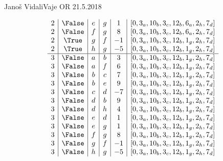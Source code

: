 \begin{naloga}{Janoš Vidali}{Vaje OR 21.5.2018}
\begin{odgovor}
\begin{tabela}
$$\begin{array}{c|c|c|c|c|c}
2 & \False & e & g &  1 & [0, 3_a, 10_b, 3_c, 12_b, 6_a, 2_h, 7_d] \\
2 & \False & f & g &  8 & [0, 3_a, 10_b, 3_c, 12_b, 6_a, 2_h, 7_d] \\
2 & \True  & g & f & -1 & [0, 3_a, 10_b, 3_c, 12_b, 1_g, 2_h, 7_d] \\
2 & \True  & h & g & -5 & [0, 3_a, 10_b, 3_c, 12_b, 1_g, 2_h, 7_d] \\ \hline
3 & \False & a & b &  3 & [0, 3_a, 10_b, 3_c, 12_b, 1_g, 2_h, 7_d] \\
3 & \False & a & f &  6 & [0, 3_a, 10_b, 3_c, 12_b, 1_g, 2_h, 7_d] \\
3 & \False & b & c &  7 & [0, 3_a, 10_b, 3_c, 12_b, 1_g, 2_h, 7_d] \\
3 & \False & b & e &  9 & [0, 3_a, 10_b, 3_c, 12_b, 1_g, 2_h, 7_d] \\
3 & \False & c & d & -7 & [0, 3_a, 10_b, 3_c, 12_b, 1_g, 2_h, 7_d] \\
3 & \False & d & b &  9 & [0, 3_a, 10_b, 3_c, 12_b, 1_g, 2_h, 7_d] \\
3 & \False & d & h &  4 & [0, 3_a, 10_b, 3_c, 12_b, 1_g, 2_h, 7_d] \\
3 & \False & e & d &  1 & [0, 3_a, 10_b, 3_c, 12_b, 1_g, 2_h, 7_d] \\
3 & \False & e & g &  1 & [0, 3_a, 10_b, 3_c, 12_b, 1_g, 2_h, 7_d] \\
3 & \False & f & g &  8 & [0, 3_a, 10_b, 3_c, 12_b, 1_g, 2_h, 7_d] \\
3 & \False & g & f & -1 & [0, 3_a, 10_b, 3_c, 12_b, 1_g, 2_h, 7_d] \\
3 & \False & h & g & -5 & [0, 3_a, 10_b, 3_c, 12_b, 1_g, 2_h, 7_d]
\end{array}
$$
\end{tabela}

\begin{slika}
\pgfslika[bf-resitev]
\end{slika}
\end{odgovor}
\end{naloga}
